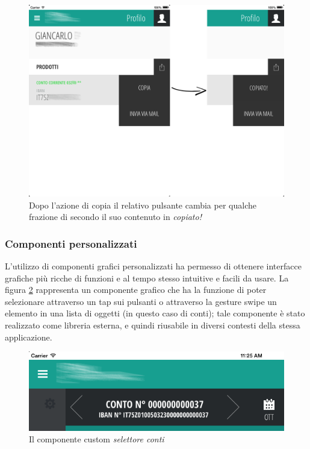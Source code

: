 \begin{figure}[htbp]
\centering
\includegraphics[scale=0.30]{ux/copia.png}
\caption{Dopo l'azione di copia il relativo pulsante cambia per qualche frazione di secondo il suo contenuto in \emph{copiato!}}
\label{fig:copy}
\end{figure}

\newpage
\subsubsection{Componenti personalizzati}
L'utilizzo di componenti grafici personalizzati ha permesso di ottenere interfacce grafiche più ricche di funzioni e al tempo stesso intuitive e facili da usare. La figura \ref{fig:selettore} rappresenta un componente grafico che ha la funzione di poter selezionare attraverso un tap sui pulsanti o attraverso la gesture swipe un elemento in una lista di oggetti (in questo caso di conti); tale componente è stato realizzato come libreria esterna, e quindi riusabile in diversi contesti della stessa applicazione.
\begin{figure}[htbp]
\centering
\includegraphics[scale=0.50]{ux/selettore.png}

\caption{Il componente custom \emph{selettore conti}}
\label{fig:selettore}
\end{figure}

